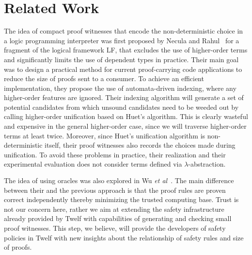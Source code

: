 \documentclass{llncs}
\newcommand{\ednote}[1]{\footnote{\it #1}}
\begin{document}
\section{Related Work}
The idea of compact proof witnesses that encode the non-deterministic
choice in a logic programming interpreter was first proposed by Necula
and Rahul~\cite{Necula+01:oracle} for a fragment of the logical
framework LF, that excludes the use of higher-order
terms and significantly limits the use of dependent types in practice.
Their main goal was to design a practical method for current
proof-carrying code applications to reduce the size of proofs
sent to a consumer.
To achieve an efficient implementation, they propose the use of
automata-driven indexing, where any higher-order features are
ignored. Their indexing algorithm will generate a set of potential
candidates from which unsound candidates need to be weeded out by
calling higher-order unification based on Huet's algorithm. This
is clearly wasteful and expensive in the general higher-order case,
since we will traverse higher-order terms at least twice. Moreover,
since Huet's unification algorithm is non-deterministic itself, their
proof witnesses also records the choices made during unification. To avoid these problems
in practice, their realization and their experimental evaluation does
not consider terms defined via $\lambda$-abstraction.  


The idea of using oracles was also explored in Wu {\em et
al}~\cite{Appel:PPDP03}.  
The main difference between their and the previous approach is that 
the proof rules are proven correct independently thereby minimizing
the trusted computing base.  Trust is not our concern here, rather we aim at extending the safety
infrastructure already provided by Twelf with capabilities of
generating and checking small proof witnesses. This step, we believe,
will provide the developers of safety policies in Twelf with new
insights about the relationship of safety rules and size of proofs.
\end{document}
